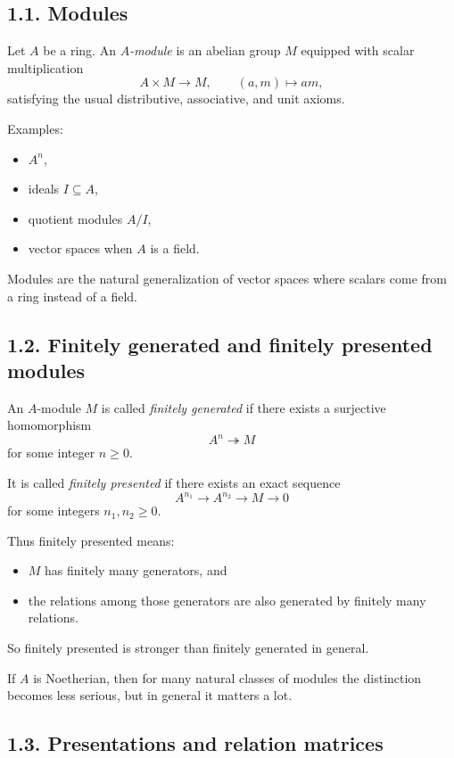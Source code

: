 \documentclass[12pt,a4paper]{article}
\theoremstyle{plain}
\theoremstyle{definition}      %
\begin{document}
\subsection*{1.1. Modules}

Let \(A\) be a ring. An \emph{\(A\)-module} is an abelian group \(M\) equipped with scalar multiplication
\[
A\times M \to M,\qquad (a,m)\mapsto am,
\]
satisfying the usual distributive, associative, and unit axioms.

Examples:
\begin{itemize}
	\item \(A^n\),
	\item ideals \(I\subseteq A\),
	\item quotient modules \(A/I\),
	\item vector spaces when \(A\) is a field.
\end{itemize}

Modules are the natural generalization of vector spaces where scalars come from a ring instead of a field.

\subsection*{1.2. Finitely generated and finitely presented modules}

An \(A\)-module \(M\) is called \emph{finitely generated} if there exists a surjective homomorphism
\[
A^n \twoheadrightarrow M
\]
for some integer \(n\ge 0\).

It is called \emph{finitely presented} if there exists an exact sequence
\[
A^{n_1}\longrightarrow A^{n_2}\longrightarrow M\longrightarrow 0
\]
for some integers \(n_1,n_2\ge 0\).

Thus finitely presented means:

\begin{itemize}
	\item \(M\) has finitely many generators, and
	\item the relations among those generators are also generated by finitely many relations.
\end{itemize}

So finitely presented is stronger than finitely generated in general.

If \(A\) is Noetherian, then for many natural classes of modules the distinction becomes less serious, but in general it matters a lot.

\subsection*{1.3. Presentations and relation matrices}
\end{document}
